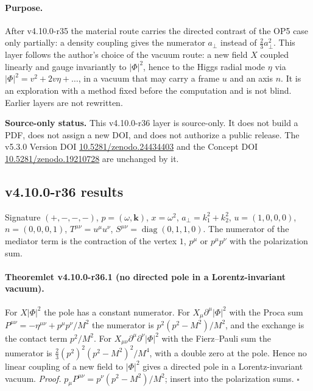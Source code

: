 \paragraph{Purpose.}
After v4.10.0-r35 the material route carries the directed contrast of the OP5 case only partially: a density coupling gives the numerator
\(a_\perp\) instead of \(\tfrac23a_\perp^2\).  This layer follows the author's choice of the vacuum route: a new field \(X\) coupled linearly and gauge
invariantly to \(|\Phi|^2\), hence to the Higgs radial mode \(\eta\) via \(|\Phi|^2=v^2+2v\eta+\dots\), in a vacuum that may carry a frame \(u\) and an axis
\(n\).  It is an exploration with a method fixed before the computation and is not blind.  Earlier layers are not rewritten.

\noindent\textbf{Source-only status.}
This v4.10.0-r36 layer is source-only.  It does not build a PDF, does not assign a new DOI,
and does not authorize a public release.  The v5.3.0 Version DOI
\href{https://doi.org/10.5281/zenodo.24434403}{10.5281/zenodo.24434403} and the Concept DOI
\href{https://doi.org/10.5281/zenodo.19210728}{10.5281/zenodo.19210728} are unchanged by it.

\subsection*{v4.10.0-r36 results}
\label{subsec:v4100-r36-results}

Signature \((+,-,-,-)\), \(p=(\omega,\mathbf k)\), \(x=\omega^2\), \(a_\perp=k_1^2+k_2^2\), \(u=(1,0,0,0)\), \(n=(0,0,0,1)\), \(T^{\mu\nu}=u^\mu u^\nu\),
\(S^{\mu\nu}=\operatorname{diag}(0,1,1,0)\).  The numerator of the mediator term is the contraction of the vertex \(1\), \(p^\mu\) or \(p^\mu p^\nu\) with the
polarization sum.

\paragraph{Theoremlet v4.10.0-r36.1 (no directed pole in a Lorentz-invariant vacuum).}
For \(X|\Phi|^2\) the pole has a constant numerator.  For \(X_\mu\partial^\mu|\Phi|^2\) with the Proca sum \(P^{\mu\nu}=-\eta^{\mu\nu}+p^\mu p^\nu/M^2\) the numerator is
\(p^2(p^2-M^2)/M^2\), and the exchange is the contact term \(p^2/M^2\).  For \(X_{\mu\nu}\partial^\mu\partial^\nu|\Phi|^2\) with the Fierz--Pauli sum the numerator is
\(\tfrac23(p^2)^2(p^2-M^2)^2/M^4\), with a double zero at the pole.  Hence no linear coupling of a new field to \(|\Phi|^2\) gives a directed pole in a
Lorentz-invariant vacuum.  \emph{Proof.} \(p_\mu P^{\mu\nu}=p^\nu(p^2-M^2)/M^2\); insert into the polarization sums.  \(\square\)

